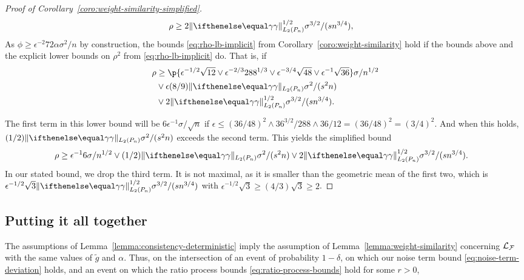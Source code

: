 \begin{proof}[Proof of Corollary~\ref{coro:weight-similarity-simplified}]
\begin{align*}
\rho   &\ge 2 \norm{\riesz}_{L_2(\Pn)}^{1/2} \sigma^{3/2}/(s n^{3/4}), && \\
\end{align*} 
As $\phi \ge \epsilon^{-2}72\alpha \sigma^2/n$ by construction, 
the bounds \eqref{eq:rho-lb-implicit} from Corollary~\ref{coro:weight-similarity}
hold if the bounds above and the explicit lower bounds on $\rho^2$ from \eqref{eq:rho-lb-implicit} do.
That is, if 
\begin{align*} 
\rho &\ge  \p{\epsilon^{-1/2}\sqrt{12} \vee \epsilon^{-2/3} 288^{1/3} \vee \epsilon^{-3/4}\sqrt{48} \vee \epsilon^{-1} \sqrt{36} }\sigma/n^{1/2} \\
     &\vee \epsilon (8/9) \norm{\riesz}_{L_2(\Pn)} \sigma^2/(s^2 n) \\
     &\vee  2 \norm{\riesz}_{L_2(\Pn)}^{1/2} \sigma^{3/2}/(s n^{3/4}).
\end{align*}

The first term in this lower bound will be $6\epsilon^{-1}\sigma/\sqrt{n}$ 
if $\epsilon \le (36/48)^2 \wedge 36^{3/2}/288 \wedge 36/12 = (36/48)^2 = (3/4)^2$. 
And when this holds, $(1/2)\norm{\riesz}_{L_2(\Pn)}\sigma^2/(s^2 n)$ exceeds the second term.
This yields the simplified bound 
\begin{align*} 
\rho &\ge  \epsilon^{-1} 6 \sigma/n^{1/2} \vee (1/2) \norm{\riesz}_{L_2(\Pn)} \sigma^2/(s^2 n) \vee  2 \norm{\riesz}_{L_2(\Pn)}^{1/2} \sigma^{3/2}/(s n^{3/4}).
\end{align*}
In our stated bound, we drop the third term.
It is not maximal, as it is smaller than the geometric mean of the first two,
which is $\epsilon^{-1/2} \sqrt{3} \norm{\riesz}_{L_2(\Pn)}^{1/2} \sigma^{3/2}/(s n^{3/4})$
with $\epsilon^{-1/2} \sqrt{3} \ge (4/3)\sqrt{3} \ge 2$.

\end{proof}



\subsection{Putting it all together}
\label{sec:putting-it-all-together}
The assumptions of Lemma~\ref{lemma:consistency-deterministic} imply the assumption of
Lemma~\ref{lemma:weight-similarity} concerning $\mathcal{L}_{\mathcal{F}}$ with the same values of $\tilde g$ and $\alpha$.
Thus, on the intersection of an event of probability $1-\delta$, on which our noise term bound \eqref{eq:noise-term-deviation} holds,
and an event on which the ratio process bounds \eqref{eq:ratio-process-bounds} hold for some $r > 0$,


